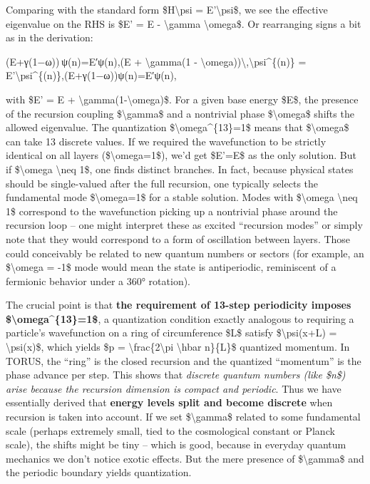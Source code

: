 Comparing with the standard form \$H\textbackslash{}psi =
E'\textbackslash{}psi\$, we see the effective eigenvalue on the RHS is
\$E' = E - \textbackslash{}gamma \textbackslash{}omega\$. Or rearranging
signs a bit as in the derivation:

(E+γ(1−ω)) ψ(n)=E′ψ(n),(E + \textbackslash{}gamma(1 -
\textbackslash{}omega))\textbackslash{},\textbackslash{}psi\^{}\{(n)\} =
E'\textbackslash{}psi\^{}\{(n)\},(E+γ(1−ω))ψ(n)=E′ψ(n),

with \$E' = E + \textbackslash{}gamma(1-\textbackslash{}omega)\$​. For a
given base energy \$E\$, the presence of the recursion coupling
\$\textbackslash{}gamma\$ and a nontrivial phase
\$\textbackslash{}omega\$ shifts the allowed eigenvalue. The
quantization \$\textbackslash{}omega\^{}\{13\}=1\$ means that
\$\textbackslash{}omega\$ can take 13 discrete values. If we required
the wavefunction to be strictly identical on all layers
(\$\textbackslash{}omega=1\$), we'd get \$E'=E\$ as the only solution.
But if \$\textbackslash{}omega \textbackslash{}neq 1\$, one finds
distinct branches. In fact, because physical states should be
single-valued after the full recursion, one typically selects the
fundamental mode \$\textbackslash{}omega=1\$ for a stable solution​.
Modes with \$\textbackslash{}omega \textbackslash{}neq 1\$ correspond to
the wavefunction picking up a nontrivial phase around the recursion loop
-- one might interpret these as excited ``recursion modes'' or simply
note that they would correspond to a form of oscillation between
layers​. Those could conceivably be related to new quantum numbers or
sectors (for example, an \$\textbackslash{}omega = -1\$ mode would mean
the state is antiperiodic, reminiscent of a fermionic behavior under a
360° rotation).

The crucial point is that \textbf{the requirement of 13-step periodicity
imposes \$\textbackslash{}omega\^{}\{13\}=1\$}, a quantization condition
exactly analogous to requiring a particle's wavefunction on a ring of
circumference \$L\$ satisfy \$\textbackslash{}psi(x+L) =
\textbackslash{}psi(x)\$, which yields \$p =
\textbackslash{}frac\{2\textbackslash{}pi \textbackslash{}hbar
n\}\{L\}\$ quantized momentum​. In TORUS, the ``ring'' is the closed
recursion and the quantized ``momentum'' is the phase advance per step.
This shows that \emph{discrete quantum numbers (like \$n\$) arise
because the recursion dimension is compact and periodic}. Thus we have
essentially derived that \textbf{energy levels split and become
discrete} when recursion is taken into account​. If we set
\$\textbackslash{}gamma\$ related to some fundamental scale (perhaps
extremely small, tied to the cosmological constant or Planck scale), the
shifts might be tiny -- which is good, because in everyday quantum
mechanics we don't notice exotic effects. But the mere presence of
\$\textbackslash{}gamma\$ and the periodic boundary yields quantization.


